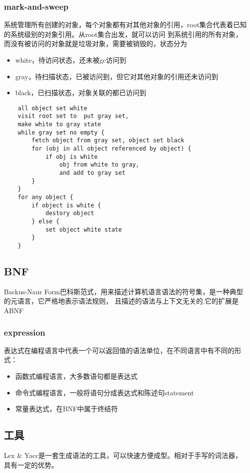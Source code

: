 \subsubsection{mark-and-sweep}
系统管理所有创建的对象，每个对象都有对其他对象的引用，root集合代表着已知的系统级别的对象引用。从root集合出发，就可以访问
到系统引用的所有对象，而没有被访问的对象就是垃圾对象，需要被销毁的，状态分为
\begin{itemize}
    \item {white，待访问状态，还未被gc访问到}
    \item {gray，待扫描状态，已被访问到，但它对其他对象的引用还未访问到}
    \item {black，已扫描状态，对象关联的都已访问到}
\end{itemize}
\begin{lstlisting}
    all object set white
    visit root set to  put gray set,
    make white to gray state 
    while gray set no empty {
        fetch object from gray set, object set black 
        for (obj in all object referenced by object) {
            if obj is white 
                obj from white to gray, 
                and add to gray set 
        }
    }
    for any object {
        if object is white {
            destory object 
        } else {
            set object white state
        }
    }
\end{lstlisting}

\subsection{BNF}
Backus-Naur Form巴科斯范式，用来描述计算机语言语法的符号集，是一种典型的元语言，它严格地表示语法规则，
且描述的语法与上下文无关的,它的扩展是ABNF 
\cite{ABNF}

\subsubsection{expression}
表达式在编程语言中代表一个可以返回值的语法单位，在不同语言中有不同的形式：
\begin{itemize}
    \item {函数式编程语言，大多数语句都是表达式}
    \item {命令式编程语言，一般将语句分成表达式和陈述句statement}
    \item {常量表达式，在BNF中属于终结符}
\end{itemize}

\subsection{工具}
Lex \& Yacc是一套生成语法的工具，可以快速方便成型。相对于手写的词法器，具有一定的优势。



